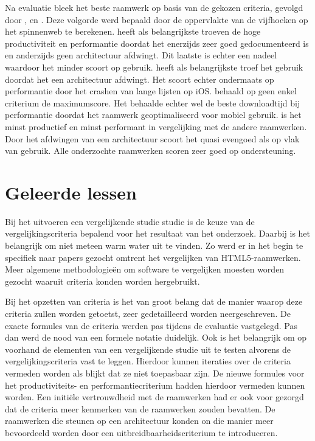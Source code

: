 Na evaluatie bleek \jqm{} het beste raamwerk op basis van de gekozen criteria, gevolgd door \kendo{}, \lungo{} en \st{}.
Deze volgorde werd bepaald door de oppervlakte van de vijfhoeken op het spinnenweb te berekenen.
\jqm{} heeft als belangrijkste troeven de hoge productiviteit en performantie doordat het enerzijds zeer goed gedocumenteerd is en anderzijds geen architectuur afdwingt.
Dit laatste is echter een nadeel waardoor het minder scoort op gebruik.
\kendo{} heeft als belangrijkste troef het gebruik doordat het een architectuur afdwingt.
Het scoort echter ondermaats op performantie door het crashen van lange lijsten op iOS.
\lungo{} behaald op geen enkel criterium de maximumscore.
Het behaalde echter wel de beste downloadtijd bij performantie doordat het raamwerk geoptimaliseerd voor mobiel gebruik.
\st{} is het minst productief en minst performant in vergelijking met de andere raamwerken.
Door het afdwingen van een architectuur scoort het quasi evengoed als \kendo{} op vlak van gebruik.
Alle onderzochte raamwerken scoren zeer goed op ondersteuning.


\section{Geleerde lessen} %
Bij het uitvoeren een vergelijkende studie studie is de keuze van de vergelijkingscriteria bepalend voor het resultaat van het onderzoek.
Daarbij is het belangrijk om niet meteen warm water uit te vinden.
Zo werd er in het begin te specifiek naar papers gezocht omtrent het vergelijken van HTML5-raamwerken.
Meer algemene methodologieën om software te vergelijken moesten worden gezocht waaruit criteria konden worden hergebruikt.

Bij het opzetten van criteria is het van groot belang dat de manier waarop deze criteria zullen worden getoetst, zeer gedetailleerd worden neergeschreven.
De exacte formules van de criteria werden pas tijdens de evaluatie vastgelegd.
Pas dan werd de nood van een formele notatie duidelijk.
Ook is het belangrijk om op voorhand de elementen van een vergelijkende studie uit te testen alvorens de vergelijkingscriteria vast te leggen.
Hierdoor kunnen iteraties over de criteria vermeden worden als blijkt dat ze niet toepasbaar zijn.
De nieuwe formules voor het productiviteits- en performantiecriterium hadden hierdoor vermeden kunnen worden.
Een initiële vertrouwdheid met de raamwerken had er ook voor gezorgd dat de criteria meer kenmerken van de raamwerken zouden bevatten.
De raamwerken die steunen op een architectuur konden on die manier meer bevoordeeld worden door een uitbreidbaarheidscriterium te introduceren.

